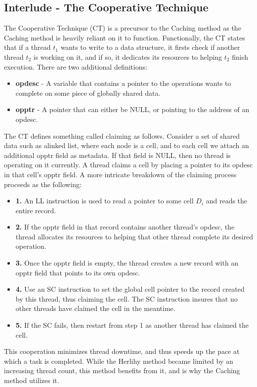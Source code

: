 \documentclass{article}
\begin{document}
\subsection*{Interlude - The Cooperative Technique}
The Cooperative Technique (CT) is a precursor to the Caching method as the Caching method is heavily reliant on it to function. Functionally, the CT states that if a thread \(t_{1}\) wants to write to a data structure, it firsts check if another thread \(t_{2}\) is working on it, and if so, it dedicates its resources to helping \(t_{2}\) finish execution. There are two additional definitions:
\begin{itemize}
    \item \textbf{opdesc} - A variable that contains a pointer to the operations wants to complete on some piece of globally shared data.
    \item \textbf{opptr} - A pointer that can either be NULL, or pointing to the address of an opdesc.
\end{itemize}
The CT defines something called claiming as follows. Consider a set of shared data such as alinked list, where each node is a cell, and to each cell we attach an additional opptr field as metadata. If that field is NULL, then no thread is operating on it currently. A thread claims a cell by placing a pointer to its opdesc in that cell's opptr field. A more intricate breakdown of the claiming process proceeds as the following:
\begin{itemize}
    \item \textbf{1.} An LL instruction is used to read a pointer to some cell \(D_{i}\) and reads the entire record.
    \item \textbf{2.} If the opptr field in that record contains another thread's opdesc, the thread allocates its resources to helping that other thread complete its desired operation.
    \item \textbf{3.} Once the opptr field is empty, the thread creates a new record with an opptr field that points to its own opdesc.
    \item \textbf{4.} Use an SC instruction to set the global cell pointer  to the record created by this thread, thus claiming the cell. The SC instruction insures that no other threads have claimed the cell in the meantime.
    \item \textbf{5.} If the SC fails, then restart from step 1 as another thread has claimed the cell.
\end{itemize}
This cooperation minimizes thread downtime, and thus speeds up the pace at which a task is completed. While the Herlihy method became limited by an increasing thread count, this method benefits from it, and is why the Caching method utilizes it.
\end{document}
